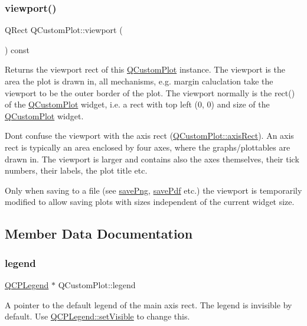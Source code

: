 \subsubsection{\texorpdfstring{viewport()}{viewport()}}
{\footnotesize\ttfamily Q\+Rect Q\+Custom\+Plot\+::viewport (\begin{DoxyParamCaption}{ }\end{DoxyParamCaption}) const\hspace{0.3cm}{\ttfamily [inline]}}

Returns the viewport rect of this \hyperlink{class_q_custom_plot}{Q\+Custom\+Plot} instance. The viewport is the area the plot is drawn in, all mechanisms, e.\+g. margin caluclation take the viewport to be the outer border of the plot. The viewport normally is the rect() of the \hyperlink{class_q_custom_plot}{Q\+Custom\+Plot} widget, i.\+e. a rect with top left (0, 0) and size of the \hyperlink{class_q_custom_plot}{Q\+Custom\+Plot} widget.

Don\textquotesingle{}t confuse the viewport with the axis rect (\hyperlink{class_q_custom_plot_ae5eefcb5f6ca26689b1fd4f6e25b42f9}{Q\+Custom\+Plot\+::axis\+Rect}). An axis rect is typically an area enclosed by four axes, where the graphs/plottables are drawn in. The viewport is larger and contains also the axes themselves, their tick numbers, their labels, the plot title etc.

Only when saving to a file (see \hyperlink{class_q_custom_plot_a7636261aff1f6d25c9da749ece3fc8b8}{save\+Png}, \hyperlink{class_q_custom_plot_a632da44c6d94ea8b271eb483b08b5114}{save\+Pdf} etc.) the viewport is temporarily modified to allow saving plots with sizes independent of the current widget size. 

\subsection{Member Data Documentation}
\hypertarget{class_q_custom_plot_a4eadcd237dc6a09938b68b16877fa6af}{}\label{class_q_custom_plot_a4eadcd237dc6a09938b68b16877fa6af} 
\subsubsection{\texorpdfstring{legend}{legend}}
{\footnotesize\ttfamily \hyperlink{class_q_c_p_legend}{Q\+C\+P\+Legend} $\ast$ Q\+Custom\+Plot\+::legend}

A pointer to the default legend of the main axis rect. The legend is invisible by default. Use \hyperlink{class_q_c_p_layerable_a3bed99ddc396b48ce3ebfdc0418744f8}{Q\+C\+P\+Legend\+::set\+Visible} to change this.

